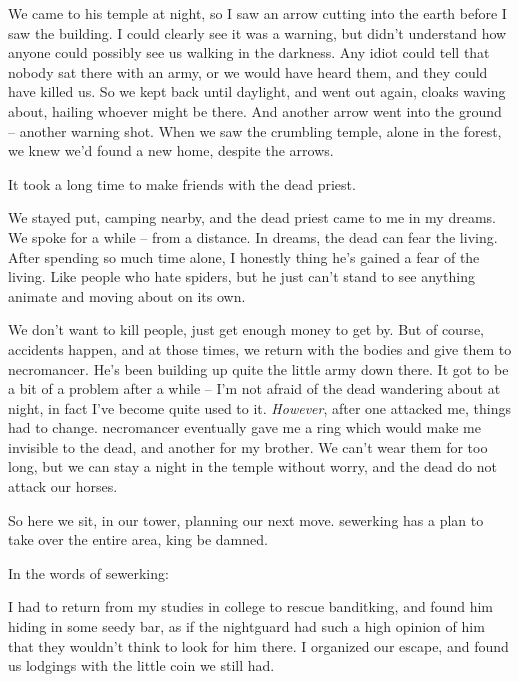 \begin{multicols}{2}
\begin{exampletext}
  We came to his temple at night, so I saw an arrow cutting into the earth before I saw the building.
  I could clearly see it was a warning, but didn't understand how anyone could possibly see us walking in the darkness.
  Any idiot could tell that nobody sat there with an army, or we would have heard them, and they could have killed us.
  So we kept back until daylight, and went out again, cloaks waving about, hailing whoever might be there.
  And another arrow went into the ground -- another warning shot.
  When we saw the crumbling temple, alone in the forest, we knew we'd found a new home, despite the arrows.

  It took a long time to make friends with the dead priest.

  We stayed put, camping nearby, and the dead priest came to me in my dreams.
  We spoke for a while -- from a distance.
  In dreams, the dead can fear the living.
  After spending so much time alone, I honestly thing he's gained a fear of the living.
  Like people who hate spiders, but he just can't stand to see anything animate and moving about on its own.

  We don't want to kill people, just get enough money to get by.
  But of course, accidents happen, and at those times, we return with the bodies and give them to \gls{necromancer}.
  He's been building up quite the little army down there.
  It got to be a bit of a problem after a while -- I'm not afraid of the dead wandering about at night, in fact I've become quite used to it.
  \emph{However}, after one attacked me, things had to change.
  \gls{necromancer} eventually gave me a ring which would make me invisible to the dead, and another for my brother.
  We can't wear them for too long, but we can stay a night in the temple without worry, and the dead do not attack our horses.

  So here we sit, in our tower, planning our next move.
  \gls{sewerking} has a plan to take over the entire area, king be damned.


\end{exampletext}

In the words of \gls{sewerking}:

\begin{exampletext}

  I had to return from my studies in \gls{college} to rescue \gls{banditking}, and found him hiding in some seedy bar, as if the \gls{nightguard} had such a high opinion of him that they wouldn't think to look for him there.
  I organized our escape, and found us lodgings with the little coin we still had.


\end{exampletext}
\end{multicols}
